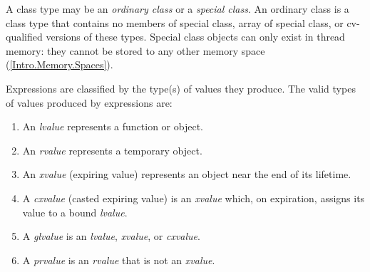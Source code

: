 
\p A class type may be an \textit{ordinary class} or a \textit{special class}.
An ordinary class is a class type that contains no members of special class,
array of special class, or cv-qualified versions of these types. Special class
objects can only exist in thread memory: they cannot be stored to any other
memory space (\ref{Intro.Memory.Spaces}).


\p Expressions are classified by the type(s) of values they produce. The valid
types of values produced by expressions are:

\begin{enumerate}
  \item An \textit{lvalue} represents a function or object.
  \item An \textit{rvalue} represents a temporary object.
  \item An \textit{xvalue} (expiring value) represents an object near the end
  of its lifetime.
  \item A \textit{cxvalue} (casted expiring value) is an \textit{xvalue}
  which, on expiration, assigns its value to a bound \textit{lvalue}.
  \item A \textit{glvalue} is an \textit{lvalue}, \textit{xvalue}, or
  \textit{cxvalue}.
  \item A \textit{prvalue} is an \textit{rvalue} that is not an \textit{xvalue}.
\end{enumerate}

